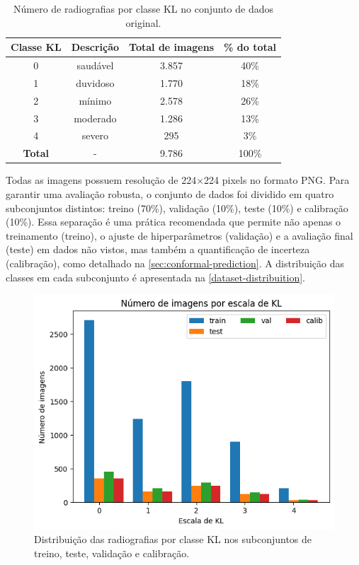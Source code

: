 \begin{table}[!htbp]
    \centering
    \caption{Número de radiografias por classe KL no conjunto de dados original.}
    \label{dataset-summary}
    \begin{tabular}{|c|c|c|c|}
        \hline
        \textbf{Classe KL} & \textbf{Descrição} & \textbf{Total de imagens} & \textbf{\% do total} \\
        \hline
        0 & saudável & 3.857 & 40\% \\
        \hline
        1 & duvidoso & 1.770 & 18\% \\
        \hline
        2 & mínimo & 2.578 & 26\% \\
        \hline
        3 & moderado & 1.286 & 13\% \\
        \hline
        4 & severo & 295 & 3\% \\
        \hline
        \textbf{Total} & - & 9.786 & 100\% \\
        \hline
    \end{tabular}
\end{table}

Todas as imagens possuem resolução de 224×224 pixels no formato PNG. Para garantir uma avaliação robusta, o conjunto de dados foi dividido em quatro subconjuntos distintos: treino (70\%), validação (10\%), teste (10\%) e calibração (10\%). Essa separação é uma prática recomendada que permite não apenas o treinamento (treino), o ajuste de hiperparâmetros (validação) e a avaliação final (teste) em dados não vistos, mas também a quantificação de incerteza (calibração), como detalhado na \autoref{sec:conformal-prediction}. A distribuição das classes em cada subconjunto é apresentada na \autoref{dataset-distribuition}.

\begin{figure}[!htbp]
    \centering
    \includegraphics[width=0.7\linewidth]{figs/dataset-class-distribution.png}
    \caption{Distribuição das radiografias por classe KL nos subconjuntos de treino, teste, validação e calibração.}
    \label{dataset-distribuition}
\end{figure}

